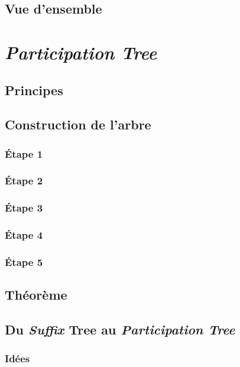 \documentclass[a4paper,10pt]{article}
\begin{document}
\subsection{Vue d'ensemble}

\section{\textit{Participation Tree}}

\subsection{Principes}

\subsection{Construction de l'arbre}

\subsubsection{Étape 1}

\subsubsection{Étape 2}

\subsubsection{Étape 3}

\subsubsection{Étape 4}

\subsubsection{Étape 5}

\subsection{Théorème}

\subsection{Du \textit{Suffix} Tree au \textit{Participation Tree}}

\subsubsection{Idées}
\end{document}
